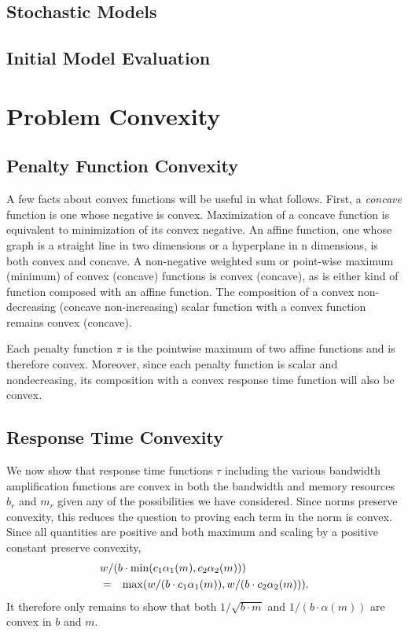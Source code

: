 \subsection*{Stochastic Models}

\subsection*{Initial Model Evaluation}


\section{Problem Convexity}\label{convex}

\subsection*{Penalty Function Convexity}
A few facts about convex functions will be useful in what follows.
First, a \emph{concave} function is one whose negative is convex.
Maximization of a concave function is equivalent to minimization of its convex negative.
An affine function, one whose graph is a straight line in two dimensions or a hyperplane in n dimensions,
is both convex and concave.  A non-negative weighted sum or point-wise maximum (minimum) of convex (concave) functions is convex (concave), as is either kind of function composed with an affine function.  The composition of a convex non-decreasing (concave non-increasing) scalar function with a convex function remains convex (concave).

Each penalty function $\pi$ is the pointwise maximum of two affine functions and is therefore convex.
Moreover, since each penalty function is scalar and nondecreasing,
its composition with a convex response time function will also be convex.

\subsection*{Response Time Convexity}
We now show that response time functions $\tau$ including the various bandwidth amplification functions are convex
in both the bandwidth and memory resources $b_r$ and $m_r$ given any of the possibilities we have considered.
Since norms preserve convexity, this reduces the question to proving each term in the norm is convex.
Since all quantities are positive and both maximum and scaling by a positive constant preserve convexity,
\begin{eqnarray*}
\lefteqn{w/(b\cdot\min(c_1\alpha_1(m),c_2\alpha_2(m)))}   \\
&=& \max(w/(b\cdot c_1\alpha_1(m)),w/(b\cdot c_2\alpha_2(m))).
\end{eqnarray*}
It therefore only remains to show that both $1/\sqrt{b\cdot m}$ and $1/(b\cdot\alpha(m))$ are convex in $b$ and $m$.

